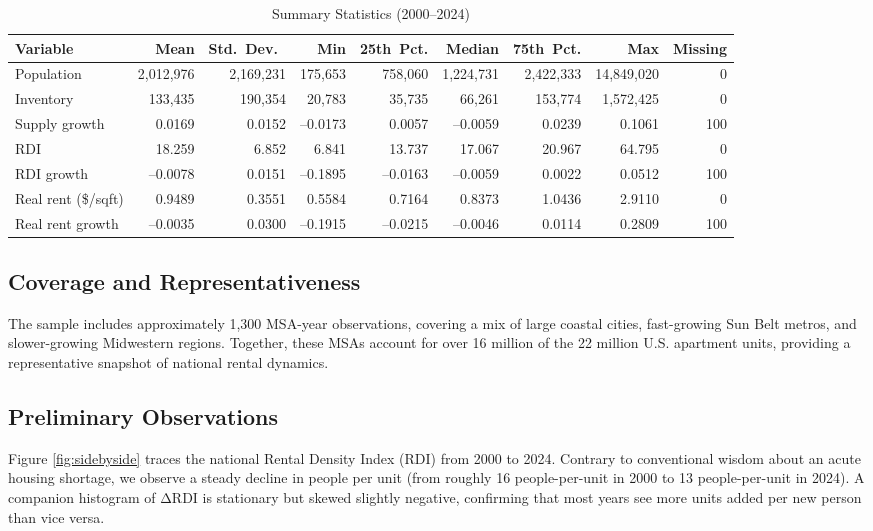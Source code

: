 \documentclass[APA,Times1COL]{WileyNJDv5} %
\begin{document}
\begin{table}[hbt!]
	\centering
	\caption{Summary Statistics (2000--2024)}\label{tab:summary_stats}
	\begin{tabular}{lrrrrrrrr}
	\toprule
	Variable & Mean       & Std.\ Dev.\   & Min       & 25th Pct.  & Median     & 75th Pct.  & Max        & Missing \\
	\midrule
	Population          & 2,012,976  & 2,169,231  &   175,653  &   758,060  & 1,224,731  & 2,422,333  & 14,849,020 &   0  \\
	Inventory           &   133,435  &   190,354  &    20,783  &    35,735  &    66,261  &   153,774  &  1,572,425 &   0  \\
	Supply growth       &      0.0169&      0.0152&     –0.0173&     0.0057 &    –0.0059 &     0.0239 &     0.1061 & 100  \\
	RDI                 &     18.259 &      6.852 &      6.841 &    13.737  &    17.067  &    20.967  &    64.795  &   0  \\
	RDI growth          &     –0.0078&      0.0151&     –0.1895&    –0.0163 &    –0.0059 &     0.0022 &     0.0512 & 100  \\
	Real rent (\$/sqft) &      0.9489&      0.3551 &      0.5584&     0.7164 &     0.8373 &     1.0436 &     2.9110 &   0  \\
	Real rent growth    &     –0.0035&      0.0300 &     –0.1915&    –0.0215 &    –0.0046 &     0.0114 &     0.2809 & 100  \\
	\bottomrule
\end{tabular}
\end{table}

\subsection{Coverage and Representativeness}
The sample includes approximately 1,300 MSA-year observations, covering a mix of large coastal cities, fast-growing Sun Belt metros, and slower-growing Midwestern regions. Together, these MSAs account for over 16 million of the 22 million U.S. apartment units, providing a representative snapshot of national rental dynamics. 

\subsection{Preliminary Observations}

Figure \ref{fig:sidebyside} traces the national Rental Density Index (RDI) from 2000 to 2024. Contrary to conventional wisdom about an acute housing shortage, we observe a steady decline in people per unit (from roughly 16 people-per-unit in 2000 to 13 people-per-unit in 2024). A companion histogram of ΔRDI is stationary but skewed slightly negative, confirming that most years see more units added per new person than vice versa.
\end{document}
